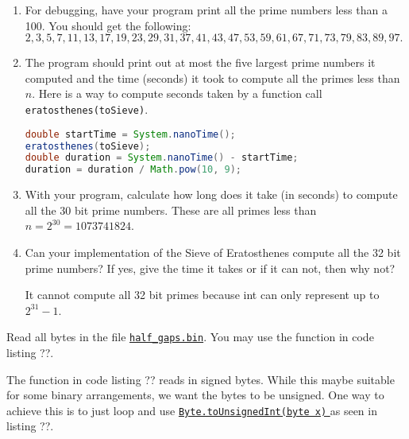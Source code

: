 \documentclass{homework}
\newcommand\docs{\href{%
    https://tinyurl.com/25w2e4wy%
  }{%
    \texttt{Byte.toUnsignedInt(byte x)}%
  }%
}
\begin{document}
\begin{enumerate}
  \item For debugging, have your program print all the prime numbers less
        than a 100. You should get the following: $ 2, 3, 5, 7, 11, 13,
          17, 19, 23, 29, 31, 37, 41, 43, 47, 53, 59, 61, 67, 71, 73, 79,
          83, 89, 97. $
  \item The program should print out at most the five largest prime
        numbers it computed and the time (seconds) it took to compute all
        the primes less than $n$. Here is a way to compute seconds taken
        by a function call \texttt{eratosthenes(toSieve)}.

        \begin{lstlisting}[language=java]
double startTime = System.nanoTime();
eratosthenes(toSieve);
double duration = System.nanoTime() - startTime;
duration = duration / Math.pow(10, 9);
\end{lstlisting}

  \item With your program, calculate how long does it take (in seconds) to
        compute all the 30 bit prime numbers. These are all primes less
        than $n = 2^{30} = 1073741824$.

  \item Can your implementation of the Sieve of Eratosthenes compute all
        the 32 bit prime numbers? If yes, give the time it takes or if it
        can not, then why not?
        \begin{sol}
          It cannot compute all 32 bit primes because int can only represent up to $2^{31}-1$.

        \end{sol}
\end{enumerate}

\question\label{32bitprimes} Read all bytes in the file
\href{https://tinyurl.com/24bvsnaf}{\texttt{half\_gaps.bin}}. You may
use the function in code listing ??.

% 

The function in code listing ?? reads in signed bytes.
While this maybe suitable for some binary arrangements, we want
the bytes to be unsigned. One way to achieve this is to just loop
and use \docs{} as seen in listing ??.

% 
\end{document}
